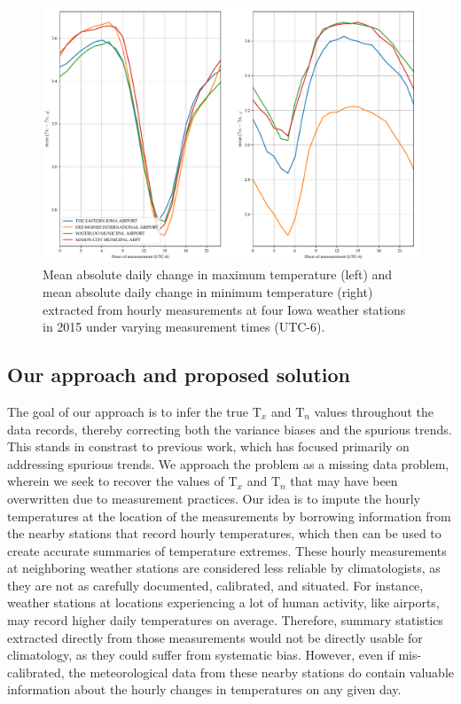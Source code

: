 \documentclass[letter]{article}
\makeatletter
\def\maxwidth{\ifdim\Gin@nat@width>\linewidth\linewidth
\else\Gin@nat@width\fi}
\let\Oldincludegraphics\includegraphics
\renewcommand{\includegraphics}[1]{\Oldincludegraphics[width=0.98\maxwidth]{#1}}
\newcommand{\T}{\mathrm{T}}
\newcommand{\Tn}{\T_{n}}
\newcommand{\Tx}{\T_{x}}
\makeatother
\begin{document}
\begin{figure}
\centering
\includegraphics{../figures/waterloo_meanabsdiff.pdf}
\caption{\label{fig:waterloo_meanabsdiff}
Mean absolute daily change in maximum temperature (left)
and mean absolute daily change in minimum temperature (right)
extracted from hourly measurements at four Iowa weather stations in 2015
under varying measurement times (UTC-6).}
\end{figure}
    


\subsection{Our approach and proposed solution}\label{our-approach-and-proposed-solution}
    
The goal of our approach is to infer the true \(\Tx\) and \(\Tn\) values throughout the data records, thereby correcting both the variance biases and the spurious trends.
This stands in constrast to previous work, which has focused primarily on addressing spurious trends.
We approach the problem as a missing data problem, wherein we seek to recover the values of \(\Tx\) and \(\Tn\) that may have been overwritten due to measurement practices. Our idea is to impute the hourly temperatures
at the location of the measurements by borrowing information from the nearby stations that record hourly temperatures, which then can be used to create accurate summaries of temperature extremes.
These hourly measurements at neighboring weather stations are considered less reliable by climatologists, as they are not as carefully documented, calibrated, and situated. For instance, weather stations at locations experiencing a lot of human activity, like airports, may record higher daily temperatures on average.
Therefore, summary statistics extracted directly from those measurements would not be directly usable for climatology, as they could suffer from systematic bias.
However, even if mis-calibrated, the meteorological data from these nearby stations do contain valuable information about the hourly changes in temperatures on any given day.
\end{document}
